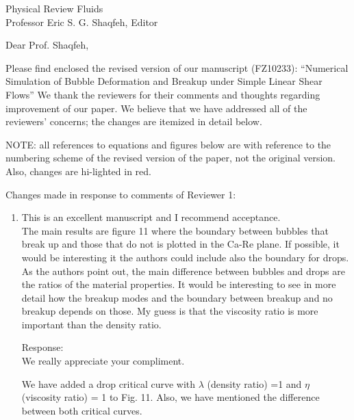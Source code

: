 \documentclass{letter}
\date{\today}
\begin{document}
\begin{letter}{
Physical Review Fluids\\
Professor Eric S. G. Shaqfeh, Editor\\}

\opening{Dear Prof. Shaqfeh,}

Please find enclosed the revised version of our manuscript (FZ10233):
``Numerical Simulation of Bubble Deformation and Breakup under Simple Linear Shear Flows''
We thank the reviewers for their comments and thoughts regarding improvement 
of our paper. We believe that we have addressed all of the reviewers’ 
concerns; the changes are itemized in detail below.

\par\noindent
NOTE: all references to equations and figures below are with
reference to the numbering scheme of the revised version of the paper,
not the original version.  Also, changes are hi-lighted in red.
\par\noindent

Changes made in response to comments of Reviewer 1: 
\begin{enumerate}
\item

\textsf
{This is an excellent manuscript and I recommend acceptance.\\
The main results are figure 11 where the boundary between bubbles that break up
and those that do not is plotted in the Ca-Re plane. If possible, it would be
interesting it the authors could include also the boundary for drops.  As the
authors point out, the main difference between bubbles and drops are the ratios
of the material properties.  It would be interesting to see in more detail how
the breakup modes and the boundary between breakup and no breakup depends on
those. My guess is that the viscosity ratio is more important than the density
ratio.}
\vspace{5 mm}

Response: \\
We really appreciate your compliment.

We have added a drop critical curve with $\lambda$ (density ratio) =1 and
$\eta$ (viscosity ratio) = 1 to Fig. 11.  Also, we have mentioned the
difference between both critical curves.


\end{enumerate}
\end{letter}
\end{document}
